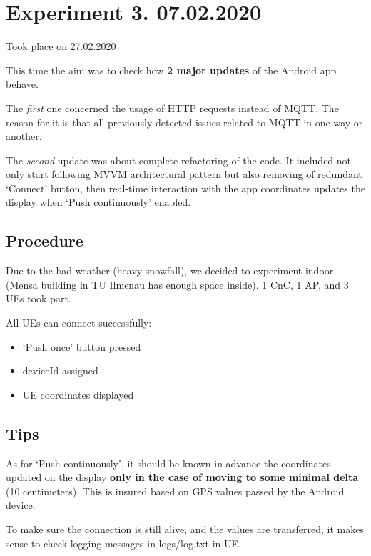 \hypertarget{experiment-3.-07.02.2020}{%
\section{Experiment 3. 07.02.2020}\label{experiment-3.-07.02.2020}}

Took place on 27.02.2020

This time the aim was to check how \textbf{2 major updates} of the Android app behave.

The \emph{first} one concerned the usage of HTTP requests instead of MQTT. The reason for it is that all previously detected issues related to MQTT in one way or another.

The \emph{second} update was about complete refactoring of the code. It included not only start following MVVM architectural pattern but also removing of redundant `Connect' button, then real-time interaction with the app coordinates updates the display when `Push continuously' enabled.

\hypertarget{procedure}{%
\subsection{Procedure}\label{procedure}}

Due to the bad weather (heavy snowfall), we decided to experiment indoor (Mensa building in TU Ilmenau has enough space inside). 1 CnC, 1 AP, and 3 UEs took part.

All UEs can connect successfully:

\begin{itemize}
\tightlist
\item
  `Push once' button pressed
\item
  deviceId assigned
\item
  UE coordinates displayed
\end{itemize}

\hypertarget{tips}{%
\subsection{Tips}\label{tips}}

As for `Push continuously', it should be known in advance the
coordinates updated on the display \textbf{only in the case of moving to
some minimal delta} (10 centimeters). This is insured based on GPS
values passed by the Android device.

To make sure the connection is still alive, and the values are transferred, it makes sense to check logging messages in logs/log.txt in UE.

